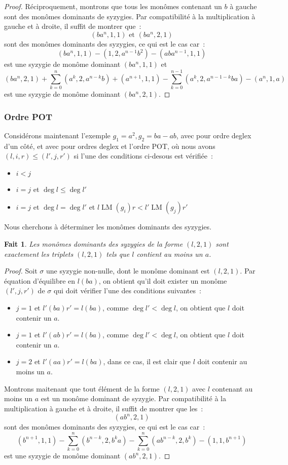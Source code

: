 \documentclass{article}
\newtheorem*{fact}{Fait}
\DeclareMathOperator{\LM}{LM}
\begin{document}
\begin{proof}
	Réciproquement, montrons que tous les monômes contenant un $b$ à gauche sont des monômes dominants de syzygies.
	Par compatibilité à la multiplication à gauche et à droite, il suffit de montrer que~:
	$$(ba^n, 1, 1) \mbox{ et } (ba^n, 2, 1)$$
	sont des monômes dominants des syzygies, ce qui est le cas car~:
	$$(ba^n, 1, 1) - (1, 2, a^{n - 1}b^2) - (aba^{n - 1}, 1, 1)$$
	est une syzygie de monôme dominant $(ba^n, 1, 1)$ et
	$$(ba^n, 2, 1) + \sum_{k = 0}^{n} (a^k, 2, a^{n - k}b) + (a^{n+1}, 1, 1) - \sum_{k = 0}^{n - 1} (a^k, 2, a^{n - 1 - k}ba) - (a^n, 1, a)$$
	est une syzygie de monôme dominant $(ba^n, 2, 1)$.	
\end{proof}

\subsubsection*{Ordre POT}

Considérons maintenant l'exemple $g_1 = a^2, g_2 = ba - ab$, avec pour ordre deglex d'un côté, et avec pour ordres deglex et l'ordre POT, où
nous avons $(l, i, r) \leq (l', j, r')$ si l'une des conditions ci-desous est vérifiée~:
\begin{itemize}
	\item $i < j$
	\item $i = j$ et $\deg{l} \leq \deg{l'}$
	\item $i = j$ et $\deg{l} = \deg{l'}$ et $l\LM(g_i)r < l'\LM(g_j)r'$
\end{itemize}

Nous cherchons à déterminer les monômes dominants des syzygies.
\begin{fact}
	Les monômes dominants des syzygies de la forme $(l, 2, 1)$ sont exactement les triplets $(l, 2, 1)$ tels que $l$ contient au moins un $a$.
\end{fact}
\begin{proof}
	Soit $\sigma$ une syzygie non-nulle, dont le monôme dominant est $(l, 2, 1)$.
	Par équation d'équilibre en $l(ba)$, on obtient qu'il doit exister un monôme $(l', j, r')$ de $\sigma$ qui doit vérifier l'une des conditions suivantes~:
	\begin{itemize}
	\item $j = 1$ et $l'(ba)r' = l(ba)$, comme $\deg{l'} < \deg{l}$, on obtient que $l$ doit contenir un $a$.
	\item $j = 1$ et $l'(ab)r' = l(ba)$, comme $\deg{l'} < \deg{l}$, on obtient que $l$ doit contenir un $a$.
	\item $j = 2$ et $l'(aa)r' = l(ba)$, dans ce cas, il est clair que $l$ doit contenir au moins un $a$.
	\end{itemize}
	
	Montrons maitenant que tout élément de la forme $(l, 2, 1)$ avec $l$ contenant au moins un $a$ est un monôme dominant de syzygie.
	Par compatibilité à la multiplication à gauche et à droite, il suffit de montrer que les~:
	$$(ab^n, 2, 1)$$
	sont des monômes dominants des syzygies, ce qui est le cas car~:
	$$(b^{n + 1}, 1, 1) - \sum_{k = 0}^n (b^{n - k}, 2, b^k a)
	- \sum_{k = 0}^n (ab^{n - k}, 2, b^k) - (1, 1, b^{n + 1})$$
	est une syzygie de monôme dominant $(ab^n, 2, 1)$.	
\end{proof}
\end{document}
